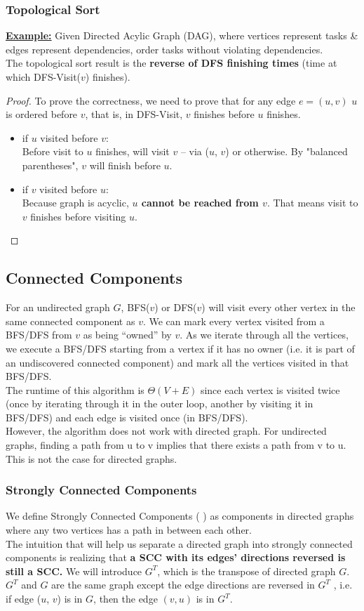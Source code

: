 \documentclass[a4paper]{article}
\renewcommand{\sb}{\vspace*{4px} \\}
\begin{document}
\subsubsection*{Topological Sort}
\textbf{\underline{Example:}} Given Directed Acylic Graph (DAG), where vertices represent tasks \& edges 
represent dependencies, order tasks without violating dependencies. \sb
The topological sort result 
is the \textbf{reverse of DFS finishing times} (time at which DFS-Visit($v$) finishes).
\begin{proof}
    To prove the correctness, we need to prove that for any edge $e=(u,v)$ 
    $u$ is ordered before $v$, that is, in DFS-Visit, 
    $v$ finishes before $u$ finishes. \begin{itemize}
        \item if $u$ visited before $v$: \sb
        Before visit to $u$ finishes, will visit $v$ -- via ($u$, $v$) or otherwise. 
        By "balanced parentheses", $v$ will finish before $u$.
        \item if $v$ visited before $u$: \sb
        Because graph is acyclic, \textbf{$u$ cannot be reached from $v$}. That means 
        visit to $v$ finishes before visiting $u$.
    \end{itemize}
\end{proof}

\subsection{Connected Components}

For an undirected graph $G$, BFS($v$) or DFS($v$) will visit every other vertex 
in the same connected component as $v$. We can mark every vertex visited from a 
BFS/DFS from $v$ as being “owned” by $v$. As we iterate through all the 
vertices, we execute a 
BFS/DFS starting from a vertex if it has no owner (i.e. it is part of an 
undiscovered connected component) and mark all the vertices visited in that 
BFS/DFS.\sb
%
The runtime of this algorithm is $\Theta(V + E)$ since each vertex is visited 
twice (once by iterating through it in the outer loop, another by visiting it 
in BFS/DFS) and each edge is visited once (in BFS/DFS).\sb
However, the algorithm does not work with directed graph. For undirected graphs, 
finding a path from u to v implies that there exists a path from v to u. This 
is not the case for directed graphs. 

\subsubsection*{Strongly Connected Components}
We define Strongly Connected Components ( ) as components in directed graphs where any two vertices has a 
path in between each other. \sb
%
The intuition that will help us separate a directed graph into strongly 
connected components is realizing that \textbf{a SCC with its edges’ directions 
reversed is still a SCC.} We will introduce $G^T$, which is the transpose 
of directed graph $G$. $G^T$ and $G$ are the same graph except the edge 
directions are reversed in $G^T$ , i.e. if edge ($u$, $v$) is in $G$, then 
the edge $(v,u)$ is in $G^T$.
\end{document}
